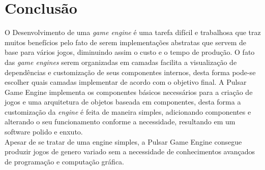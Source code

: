 \documentclass[12pt,	openright, twoside,	a4paper, english, french, spanish, brazil]{abntex2}
\begin{document}
%
%

\chapter{Conclusão} \label{cap: conclusao}


O Desenvolvimento de uma \textit{game engine} é uma tarefa difícil e trabalhosa que traz muitos benefícios pelo fato de serem implementações abstratas que servem de base para vários jogos, diminuindo assim o custo e o tempo de produção. O fato das \textit{game engines} serem organizadas em camadas facilita a visualização de dependências e customização de seus componentes internos, desta forma pode-se escolher quais camadas implementar de acordo com o objetivo final. A Pulsar Game Engine implementa os componentes básicos necessários para a criação de jogos e uma arquitetura de objetos baseada em componentes, desta forma a customização da \textit{engine} é feita de maneira simples, adicionando componentes e alterando o seu funcionamento conforme a necessidade, resultando em um software polido e enxuto. \\
Apesar de se tratar de uma engine simples, a Pulsar Game Engine consegue produzir jogos de genero variado sem a necessidade de conhecimentos avançados de programação e computação gráfica.



\postextual

%



\printindex
\end{document}
